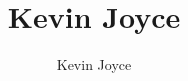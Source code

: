 \documentclass{homework}
\title{Kevin Joyce}
\author{Kevin Joyce}
\begin{document}
 
\newcommand{\figref}[1]{\figurename~\ref{#1}}
\renewcommand{\bar}{\overline}
\renewcommand{\hat}{\widehat}
\renewcommand{\SS}{\mathcal S}
\newcommand{\HH}{\mathscr H}
\newcommand{\mom}{\widetilde}
\newcommand{\mle}{\widehat \Uptheta}
\newcommand{\eps}{\varepsilon}
\newcommand{\todist}{\stackrel{D}\longrightarrow}
\newcommand{\toprob}{\stackrel{p}\longrightarrow}
\newcommand{\TTheta}{\overline{\underline \Theta} }
\newcommand{\del}{\partial}
\newcommand{\approxsim}{\overset{\cdotp}{\underset{\cdotp}{\sim}}}
\newcommand{\RSS}{\ensuremath{\mathrm{RSS}}}
\newcommand{\MSE}{\ensuremath{\mathrm{MSE}}}
\newcommand{\SE}{\ensuremath{\mathrm{SE}}}
\newcommand{\TSS}{\ensuremath{\mathrm{TSS}}}
\newcommand{\Var}{\ensuremath{\mathrm{Var}}}
\newcommand{\SSReg}{\ensuremath{\mathrm{SSReg}}}
\renewcommand{\a}[1]{{\color{red} \it #1}}
\end{document}

